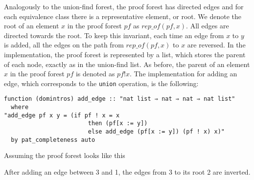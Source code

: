 Analogously to the union-find forest, the proof forest has directed edges and for each equivalence class there is a representative element, or root. We denote the root of an element $x$ in the proof forest $pf$ as $rep\_of(pf, x)$. All edges are directed towards the root. To keep this invariant, each time an edge from $x$ to $y$ is added, all the edges on the path from $rep\_of(pf, x)$ to $x$ are reversed.
In the implementation, the proof forest is represented by a list, which stores the parent of each node, exactly as in the union-find list. As before, the parent of an element $x$ in the proof forest $pf$ is denoted as $pf ! x$. The implementation for adding an edge, which corresponds to the \lstinline{union} operation, is the following:

\begin{lstlisting}
function (domintros) add_edge :: "nat list ⇒ nat ⇒ nat ⇒ nat list"
  where
"add_edge pf x y = (if pf ! x = x
                        then (pf[x := y])
                        else add_edge (pf[x := y]) (pf ! x) x)"
  by pat_completeness auto
\end{lstlisting}

\begin{exmp}
Assuming the proof forest looks like this

\begin{center}
\end{center}

After adding an edge between 3 and 1, the edges from 3 to its root 2 are inverted.

\begin{center}
\end{center}
\end{exmp}

